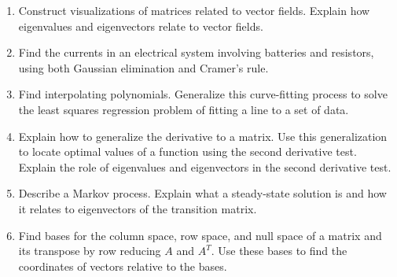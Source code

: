 \begin{enumerate}

\item Construct visualizations of matrices related to vector fields. Explain how eigenvalues and eigenvectors relate to vector fields.
\item Find the currents in an electrical system involving batteries and resistors, using both Gaussian elimination and Cramer's rule.
\item Find interpolating polynomials. Generalize this curve-fitting process to solve the least squares regression problem of fitting a line to a set of data.
\item Explain how to generalize the derivative to a matrix. Use this
  generalization to locate optimal values of a function using the second derivative test. Explain the role of eigenvalues and eigenvectors in the second derivative test.
\item Describe a Markov process. Explain what a steady-state solution is and how it relates to eigenvectors of the transition matrix.
\item Find bases for the column space, row space, and null space of a matrix and its transpose by row reducing $A$ and $A^T$. Use these bases to find the coordinates of vectors relative to the bases.

\end{enumerate}



